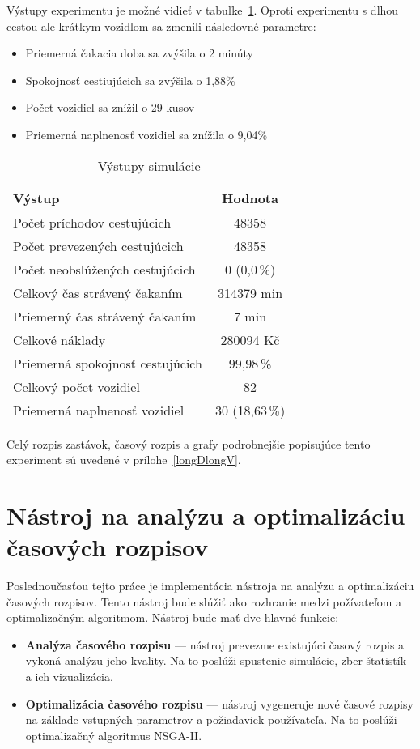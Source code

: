 Výstupy experimentu je možné vidieť v tabuľke~\ref{tab:longDlongVout}.
Oproti experimentu s dlhou cestou ale krátkym vozidlom sa zmenili následovné parametre:
\begin{itemize}
  \item Priemerná čakacia doba sa zvýšila o 2 minúty
  \item Spokojnosť cestiujúcich sa zvýšila o 1,88\%
  \item Počet vozidiel sa znížil o 29 kusov
  \item Priemerná naplnenosť vozidiel sa znížila o 9,04\%
\end{itemize}

\begin{table}[h]
  \centering
  \begin{tabular}{|l|c|}
    \hline
      \textbf{Výstup} & \textbf{Hodnota} \\ \hline
        Počet príchodov cestujúcich & 48358 \\ \hline
          Počet prevezených cestujúcich & 48358 \\ \hline
          Počet neobslúžených cestujúcich & 0 (0,0\,\%) \\ \hline
          Celkový čas strávený čakaním & 314379 min \\ \hline
          Priemerný čas strávený čakaním & 7 min \\ \hline
          Celkové náklady & 280094 Kč \\ \hline
          Priemerná spokojnosť cestujúcich & 99,98\,\% \\ \hline
          Celkový počet vozidiel & 82 \\ \hline
          Priemerná naplnenosť vozidiel & 30 (18,63\,\%) \\ \hline
  \end{tabular}
  \caption{Výstupy simulácie}
  \label{tab:longDlongVout}
\end{table}

Celý rozpis zastávok, časový rozpis a grafy podrobnejšie popisujúce tento experiment sú uvedené v prílohe~\ref{longDlongV}.

\chapter{Nástroj na analýzu a optimalizáciu časových rozpisov}\label{nastroj}

Poslednoučasťou tejto práce je implementácia nástroja na analýzu a optimalizáciu časových rozpisov.
Tento nástroj bude slúžiť ako rozhranie medzi požívateľom a optimalizačným algoritmom.
Nástroj bude mať dve hlavné funkcie:
\begin{itemize}
  \item \textbf{Analýza časového rozpisu} --- nástroj prevezme existujúci časový rozpis a vykoná analýzu jeho kvality. Na to poslúži spustenie simulácie, zber štatistík a ich vizualizácia.
  \item \textbf{Optimalizácia časového rozpisu} --- nástroj vygeneruje nové časové rozpisy na základe vstupných parametrov a požiadaviek používateľa. Na to poslúži optimalizačný algoritmus NSGA-II.
\end{itemize}


